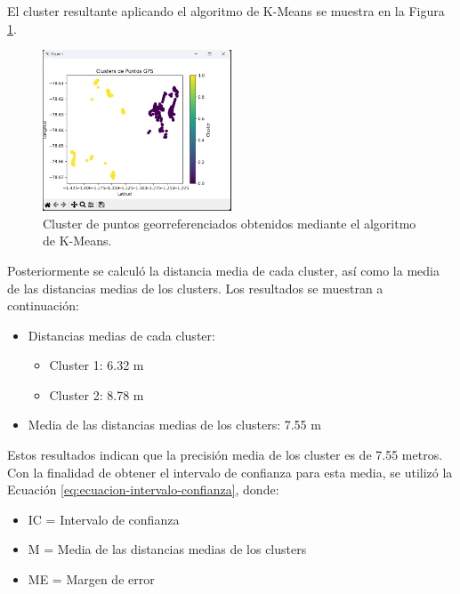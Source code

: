 El cluster resultante aplicando el algoritmo de K-Means se muestra en la Figura \ref{fig:cluster-georreferenciacion}.

\begin{figure}[H]
    \centering
    \includegraphics[width=0.5\textwidth]{chapters/III-resultados-y-discusion/resources/images/cluster-georreferenciacion.png}
    \caption{Cluster de puntos georreferenciados obtenidos mediante el algoritmo de K-Means.}
    \label{fig:cluster-georreferenciacion}
\end{figure}

Posteriormente se calculó la distancia media de cada cluster, así como la media de las distancias medias de los clusters. Los resultados
se muestran a continuación:

\begin{itemize}
    \item Distancias medias de cada cluster:
          \begin{itemize}
              \item Cluster 1: 6.32 m
              \item Cluster 2: 8.78 m
          \end{itemize}
    \item Media de las distancias medias de los clusters: 7.55 m
\end{itemize}

Estos resultados indican que la precisión media de los cluster es de 7.55 metros. Con la finalidad de obtener el intervalo de
confianza para esta media, se utilizó la Ecuación \ref{eq:ecuacion-intervalo-confianza}, donde:

\begin{itemize}
    \item IC = Intervalo de confianza
    \item M = Media de las distancias medias de los clusters
    \item ME = Margen de error
\end{itemize}

